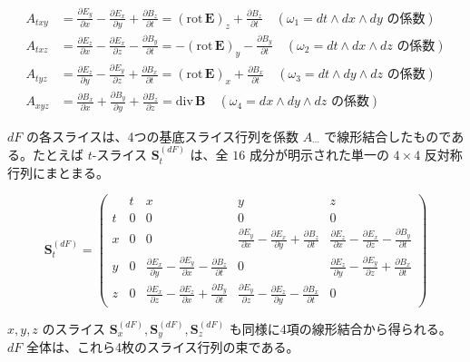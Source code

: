 \documentclass[a4paper,12pt,openany]{book}
\begin{document}
\[
\begin{aligned}
A_{txy} &= \frac{\partial E_y}{\partial x} - \frac{\partial E_x}{\partial y} + \frac{\partial B_z}{\partial t} = (\mathrm{rot}\,\mathbf{E})_z + \frac{\partial B_z}{\partial t}
\quad (\omega_1 = dt\wedge dx\wedge dy\text{ の係数}) \\[6pt]
A_{txz} &= \frac{\partial E_z}{\partial x} - \frac{\partial E_x}{\partial z} - \frac{\partial B_y}{\partial t} = -(\mathrm{rot}\,\mathbf{E})_y - \frac{\partial B_y}{\partial t}
\quad (\omega_2 = dt\wedge dx\wedge dz\text{ の係数}) \\[6pt]
A_{tyz} &= \frac{\partial E_z}{\partial y} - \frac{\partial E_y}{\partial z} + \frac{\partial B_x}{\partial t} = (\mathrm{rot}\,\mathbf{E})_x + \frac{\partial B_x}{\partial t}
\quad (\omega_3 = dt\wedge dy\wedge dz\text{ の係数}) \\[6pt]
A_{xyz} &= \frac{\partial B_x}{\partial x} + \frac{\partial B_y}{\partial y} + \frac{\partial B_z}{\partial z} = \mathrm{div}\,\mathbf{B}
\quad (\omega_4 = dx\wedge dy\wedge dz\text{ の係数})
\end{aligned}
\]

\(dF\) の各スライスは、4つの基底スライス行列を係数 \(A_{\cdots}\)
で線形結合したものである。たとえば \(t\)-スライス
\(\mathbf{S}_{t}^{(dF)}\) は、全 \(16\) 成分が明示された単一の
\(4\times4\) 反対称行列にまとまる。

\[
\mathbf{S}_{t}^{(dF)}
{=}
\left(\begin{array}{c|cccc}
 & t & x & y & z \\\hline
t & 0 & 0 & 0 & 0 \\[6pt]
x & 0 & 0 &
\displaystyle \frac{\partial E_y}{\partial x} - \frac{\partial E_x}{\partial y} + \frac{\partial B_z}{\partial t} &
\displaystyle \frac{\partial E_z}{\partial x} - \frac{\partial E_x}{\partial z} - \frac{\partial B_y}{\partial t} \\[14pt]
y & 0 &
\displaystyle \frac{\partial E_x}{\partial y} - \frac{\partial E_y}{\partial x} - \frac{\partial B_z}{\partial t} &
0 &
\displaystyle \frac{\partial E_z}{\partial y} - \frac{\partial E_y}{\partial z} + \frac{\partial B_x}{\partial t} \\[14pt]
z & 0 &
\displaystyle \frac{\partial E_x}{\partial z} - \frac{\partial E_z}{\partial x} + \frac{\partial B_y}{\partial t} &
\displaystyle \frac{\partial E_y}{\partial z} - \frac{\partial E_z}{\partial y} - \frac{\partial B_x}{\partial t} &
0
\end{array}\right)
\]

\(x,y,z\) のスライス
\(\mathbf{S}_{x}^{(dF)}, \mathbf{S}_{y}^{(dF)}, \mathbf{S}_{z}^{(dF)}\)
も同様に4項の線形結合から得られる。\(dF\)
全体は、これら4枚のスライス行列の束である。
\end{document}
